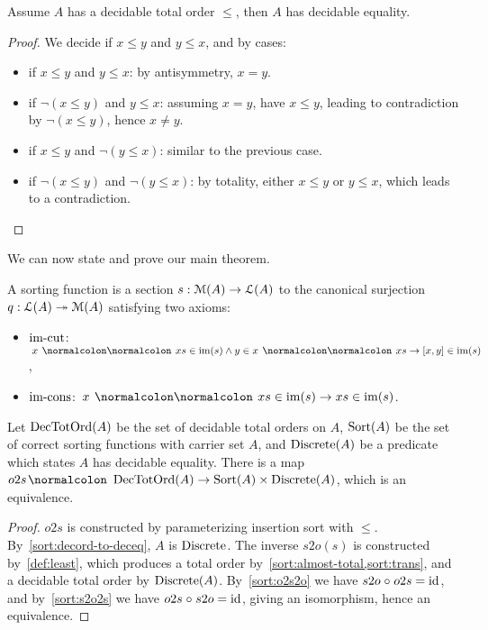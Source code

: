\begin{proposition}\label{sort:decord-to-deceq}
    Assume $A$ has a decidable total order $\leq$,
    then $A$ has decidable equality.
\end{proposition}
\begin{proof}
    We decide if $x \leq y$ and $y \leq x$, and by cases:
    \begin{itemize}
        \item
              if $x \leq y$ and $y \leq x$: by antisymmetry, $x = y$.
        \item
              if $\neg(x \leq y)$ and $y \leq x$: assuming $x = y$, have $x \leq y$,
              leading to contradiction by $\neg(x \leq y)$, hence $x \neq y$.
        \item
              if $x \leq y$ and $\neg(y \leq x)$: similar to the previous case.
        \item
              if $\neg(x \leq y)$ and $\neg(y \leq x)$: by totality, either
              $x \leq y$ or $y \leq x$, which leads to a contradiction.
    \end{itemize}
\end{proof}
\noindent
We can now state and prove our main theorem.
\begin{definition}
    \leavevmode
    A sorting function is a section $s : \mathcal{M}(A) \to \mathcal{L}(A)$ to
    the canonical surjection $q : \mathcal{L}(A) \twoheadrightarrow \mathcal{M}(A)$ satisfying two axioms:
    \begin{itemize}[leftmargin=*]
        \item $\isheadleast$:
              \(\,
              \inimage{x \cons xs} \land y \in x \cons xs \to \inimage{[x, y]}
              \),
        \item $\istailsort$:
              \(\,
              \inimage{x \cons xs} \to \inimage{xs}
              \).
    \end{itemize}
\end{definition}
\begin{theorem}\label{sort:main}
    Let $\term{DecTotOrd}(A)$ be the set of decidable total orders on $A$,
    $\term{Sort}(A)$ be the set of correct sorting functions with carrier set $A$,
    and $\term{Discrete}(A)$ be a predicate which states $A$ has decidable equality.
    There is a map $o2s \colon \term{DecTotOrd}(A) \to \term{Sort}(A) \times \term{Discrete}(A)$,
    which is an equivalence.
\end{theorem}
\begin{proof}
    $o2s$ is constructed by parameterizing insertion sort with $\leq$.
    By~\cref{sort:decord-to-deceq}, $A$ is $\term{Discrete}$.
    The inverse $s2o(s)$ is constructed by~\cref{def:least}, which produces
    a total order by~\cref{sort:almost-total,sort:trans},
    and a decidable total order by $\term{Discrete}(A)$.
    By~\cref{sort:o2s2o} we have $s2o \comp o2s \id \idfunc$,
    and by~\cref{sort:s2o2s} we have $o2s \comp s2o \id \idfunc$,
    giving an isomorphism, hence an equivalence.
\end{proof}

